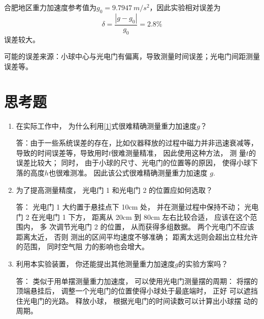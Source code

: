 \documentclass[12pt]{article}
\begin{document}
合肥地区重力加速度参考值为$g_0=\SI{9.7947}{m/s^2}$，因此实验相对误差为
\[\delta =\frac{|g-g_0|}{g_0}=2.8\%\]
误差较大。

可能的误差来源：小球中心与光电门有偏离，导致测量时间误差；光电门间距测量误差等。



\section*{思考题}
\begin{enumerate}
    \item 在实际工作中， 为什么利用\eqref{1}式很难精确测量重力加速度$ g$？
    
    答：由于一些系统误差的存在，比如仪器释放的过程中磁力并非迅速衰减等，导致的时间误差等，导致用时$ t $很难测量精准， 因此使用这种方法， 测
    量$ t $的误差比较大； 同时， 由于小球的尺寸、光电门的位置等的原因， 使得小球下
    落的高度$ h $也很难测准。 因此该公式很难精确测量重力加速度 $g$.

\item 为了提高测量精度， 光电门 1 和光电门 2 的位置应如何选取？

答： 光电门 1 大约置于悬挂点下 10cm 处， 并在测量过程中保持不动； 光电门
2 在光电门 1 下方， 距离从 20cm 到 80cm 左右比较合适， 应该在这个范围内， 多
次调节光电门 2 的位置， 从而获得多组数据。 两个光电门不应该距离太近， 否则
测出的区间平均速度不够准确； 距离太远则会超出立柱允许的范围， 同时空气阻
力的影响也会增大。

\item 利用本实验装置， 你还能提出其他测量重力加速度$ g $的实验方案吗？

答： 类似于用单摆测量重力加速度， 可以使用光电门测量摆的周期： 
将摆的顶端悬挂后， 调整一个光电门的位置使得小球处于最底端时， 正好
可以遮挡住光电门的光路。 释放小球， 根据光电门的时间读数可以计算出小球摆
动的周期。
\end{enumerate}
\end{document}
